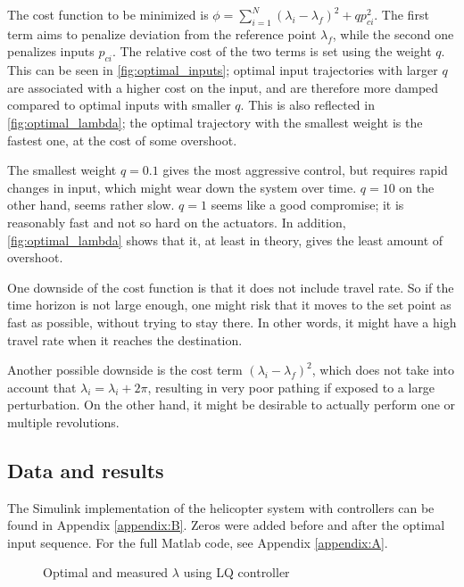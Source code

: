 The cost function to be minimized is $\phi = \sum_{i=1}^{N} (\lambda_i-\lambda_f)^2 + qp_{ci}^2$. The first term aims to penalize deviation from the reference point $\lambda_f$, while the second one penalizes inputs $p_{ci}$. The relative cost of the two terms is set using the weight $q$. This can be seen in \cref{fig:optimal_inputs}; optimal input trajectories with larger $q$ are associated with a higher cost on the input, and are therefore more damped compared to optimal inputs with smaller $q$. This is also reflected in \cref{fig:optimal_lambda}; the optimal trajectory with the smallest weight is the fastest one, at the cost of some overshoot.

The smallest weight $q=0.1$ gives the most aggressive control, but requires rapid changes in input, which might wear down the system over time. $q=10$ on the other hand, seems rather slow. $q=1$ seems like a good compromise; it is reasonably fast and not so hard on the actuators. In addition, \cref{fig:optimal_lambda} shows that it, at least in theory, gives the least amount of overshoot.

One downside of the cost function is that it does not include travel rate. So if the time horizon is not large enough, one might risk that it moves to the set point as fast as possible, without trying to stay there. In other words, it might have a high travel rate when it reaches the destination.

Another possible downside is the cost term $(\lambda_i - \lambda_f)^2$, which does not take into account that $\lambda_i = \lambda_ i + 2\pi$, resulting in very poor pathing if exposed to a large perturbation. On the other hand, it might be desirable to actually perform one or multiple revolutions.
\clearpage

\subsection{Data and results}
The Simulink implementation of the helicopter system with controllers can be found in Appendix \ref{appendix:B}. Zeros were added before and after the optimal input sequence. For the full Matlab code, see Appendix \ref{appendix:A}.

\begin{figure}[H]
    \centering
    \caption{Optimal and measured $\lambda$ using LQ controller}
    \label{fig:optimal_and_measured}
\end{figure}

